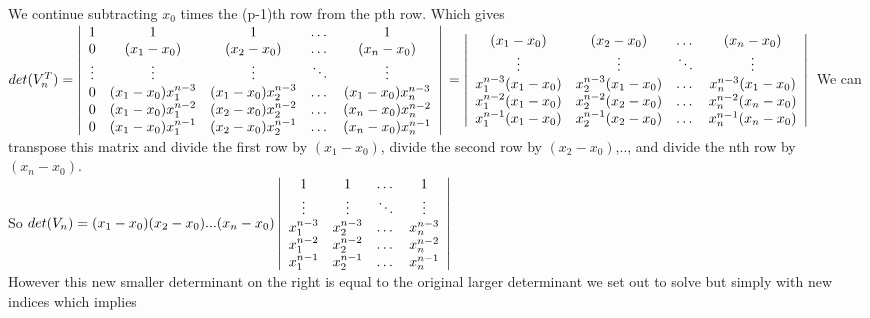 \documentclass[12pt]{article}
\newenvironment{problems}{\begin{list}{}{\setlength{\labelwidth}{.7in}}}{\end{list}}
\begin{document}
\begin{problems}
  
  We continue subtracting $x_0$ times the (p-1)th row from the pth row. Which gives\\
  $det(V_n^T) = \left|  \begin{array}{ccccc}
   1           &  1                     & 1                        & \dots      & 1                  \\
   0           &  (x_1 - x_0)           & (x_2 - x_0)              & \dots      & (x_n - x_0)         \\
   \vdots      &  \vdots                & \vdots                   & \ddots     & \vdots                \\
   0           &  (x_1 - x_0)x_1^{n-3}  & (x_1 - x_0)x_2^{n-3}     & \dots      & (x_1 - x_0)x_n^{n-3} \\
   0           &  (x_1 - x_0)x_1^{n-2}  & (x_2 - x_0)x_2^{n-2}     & \dots      & (x_n -  x_0)x_n^{n-2} \\
   0           &  (x_1 - x_0)x_1^{n-1}  & (x_2 - x_0)x_2^{n-1}     & \dots      &(x_n - x_0)x_n^{n-1}      \\
  \end{array}           \right|\\ 
   = 
  \left|  \begin{array}{ccccc}
    (x_1 - x_0)           & (x_2 - x_0)              & \dots      & (x_n - x_0)         \\
   \vdots                & \vdots                   & \ddots     & \vdots                \\
   x_1^{n-3}(x_1 - x_0)  & x_2^{n-3}(x_1 - x_0)     & \dots      & x_n^{n-3}(x_1 - x_0) \\
    x_1^{n-2}(x_1 - x_0)  & x_2^{n-2}(x_2 - x_0)     & \dots      & x_n^{n-2}(x_n -  x_0) \\
   x_1^{n-1}(x_1 - x_0)  & x_2^{n-1}(x_2 - x_0)     & \dots      &x_n^{n-1}(x_n - x_0)      \\
  \end{array}           \right|\\  
  $
  We can transpose this matrix and divide the first row by $(x_1-x_0)$, divide the second row by $(x_2-x_0)$,.., and divide the nth row by $(x_n-x_0)$. \\
  
  So $det(V_n) = (x_1-x_0)(x_2-x_0)...(x_n-x_0)\left|  \begin{array}{ccccc}
    1           & 1              & \dots      & 1        \\
   \vdots                & \vdots                   & \ddots     & \vdots                \\
   x_1^{n-3}  & x_2^{n-3}    & \dots      & x_n^{n-3} \\
    x_1^{n-2} & x_2^{n-2}     & \dots      & x_n^{n-2} \\
   x_1^{n-1}  & x_2^{n-1}    & \dots      &x_n^{n-1}      \\
  \end{array}           \right|\\  
  $\\
  However this new smaller determinant on the right is equal to the original larger determinant we set out to solve but simply with new indices which implies
  

\end{problems}
\end{document}

